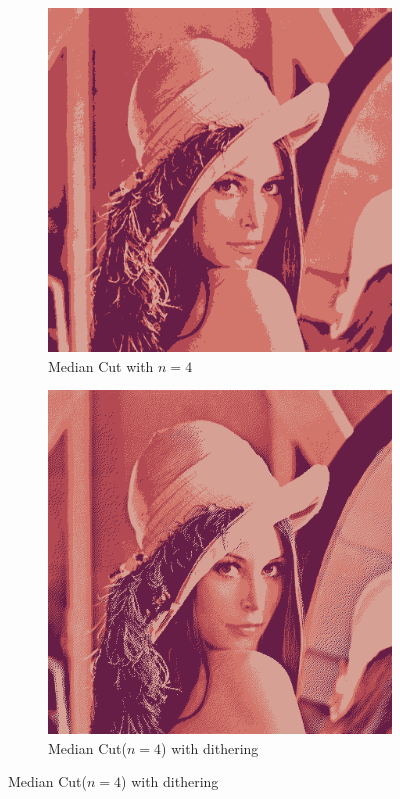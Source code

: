 \documentclass{article}
\begin{document}
\begin{figure}[!ht]
\begin{subfigure}{.5\textwidth}
\centering
\includegraphics[width=.75\linewidth]{img1_2.png}
\caption{Median Cut with $n = 4$}
\end{subfigure}
\begin{subfigure}{.5\textwidth}
\centering
\includegraphics[width=.75\linewidth]{img1_3.png}
\caption{Median Cut($n = 4$) with dithering}
\end{subfigure}
\end{figure}

\clearpage
\end{document}
